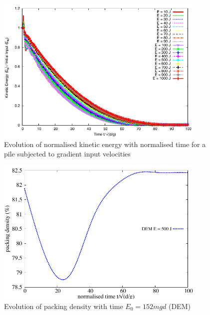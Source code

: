 \begin{figure}[tbhp]
\centering
\includegraphics[width=0.9\textwidth]{Normalised_Energy_Time_Slope_DEM}
\caption{Evolution of normalised kinetic energy with normalised time for a pile 
subjected to gradient input velocities}
\label{fig:Normalised_Energy_Time_Slope_DEM}
\end{figure}

\begin{figure}[tbhp]
\centering
\includegraphics[width=0.9\textwidth]{voro_500}
\caption{Evolution of packing density with time $E_0 = 152 mgd$ (DEM)}
\label{fig:voro_500}
\end{figure}

